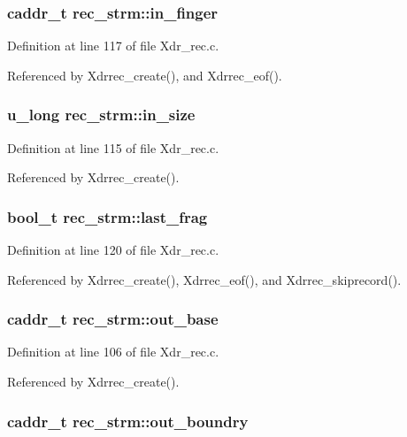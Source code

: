 \subsubsection{\setlength{\rightskip}{0pt plus 5cm}caddr\_\-t {\bf rec\_\-strm::in\_\-finger}}\label{structrec__strm_o11}




Definition at line 117 of file Xdr\_\-rec.c.

Referenced by Xdrrec\_\-create(), and Xdrrec\_\-eof().
\subsubsection{\setlength{\rightskip}{0pt plus 5cm}u\_\-long {\bf rec\_\-strm::in\_\-size}}\label{structrec__strm_o9}




Definition at line 115 of file Xdr\_\-rec.c.

Referenced by Xdrrec\_\-create().
\subsubsection{\setlength{\rightskip}{0pt plus 5cm}bool\_\-t {\bf rec\_\-strm::last\_\-frag}}\label{structrec__strm_o14}




Definition at line 120 of file Xdr\_\-rec.c.

Referenced by Xdrrec\_\-create(), Xdrrec\_\-eof(), and Xdrrec\_\-skiprecord().
\subsubsection{\setlength{\rightskip}{0pt plus 5cm}caddr\_\-t {\bf rec\_\-strm::out\_\-base}}\label{structrec__strm_o3}




Definition at line 106 of file Xdr\_\-rec.c.

Referenced by Xdrrec\_\-create().
\subsubsection{\setlength{\rightskip}{0pt plus 5cm}caddr\_\-t {\bf rec\_\-strm::out\_\-boundry}}\label{structrec__strm_o5}




